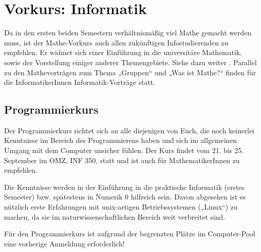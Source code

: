 \section{Vorkurs: Informatik}
\label{vkinfo}
Da in den ersten beiden Semestern verhältnismäßig viel Mathe gemacht werden muss, ist der Mathe-Vorkurs auch allen zukünftigen Infostudierenden zu empfehlen. Er widmet sich einer Einführung in die universitäre Mathematik, sowie der Vorstellung einiger anderer Themengebiete. Siehe dazu weiter
.
Parallel zu den Mathevorträgen zum Thema „Gruppen“ und „Was ist Mathe?“ finden für die InformatikerInnen Informatik-Vorträge statt.

\parskip

\subsection{Programmierkurs}
Der Programmierkurs richtet sich an alle diejenigen von Euch, die noch keinerlei Kenntnisse im Bereich des Programmierens haben und sich im allgemeinen Umgang mit dem Computer unsicher fühlen. Der Kurs findet vom 21. bis 25. September im OMZ, \gls{INF} 350, statt und ist auch für MathematikerInnen zu empfehlen.

Die Kenntnisse werden in der Einführung in die praktische Informatik (erstes
Semester) bzw. spätestens in Numerik 0 hilfreich sein. Davon abgesehen ist es
nützlich erste Erfahrungen mit unix-artigen Betriebssystemen („Linux“) zu
machen, da sie im naturwissenschaftlichen Bereich weit verbreitet sind.

Für den Programmierkurs ist aufgrund der begrenzten Plätze im Computer-Pool
eine vorherige Anmeldung erforderlich!

